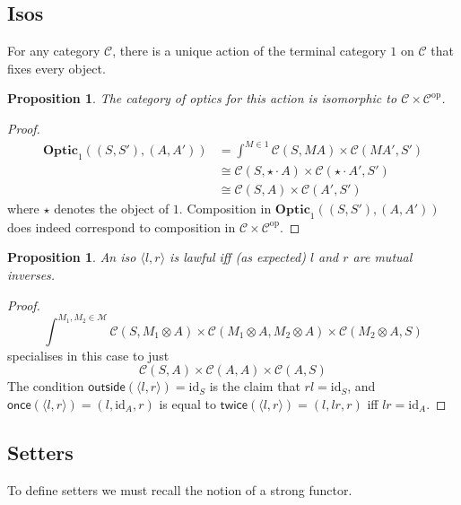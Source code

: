 \documentclass[11pt,a4paper]{article}
\theoremstyle{plain}
\newtheorem{proposition}[theorem]{Proposition}
\theoremstyle{definition}
\newcommand{\C}{\mathscr{C}}
\newcommand{\M}{\mathscr{M}}
\newcommand{\Optic}{\mathbf{Optic}}
\newcommand{\id}{\mathrm{id}}
\newcommand{\op}{\mathrm{op}}
\newcommand{\outside}{\mathsf{outside}}
\newcommand{\once}{\mathsf{once}}
\newcommand{\twice}{\mathsf{twice}}
\begin{document}
\subsection{Isos}

For any category $\C$, there is a unique action of the terminal category $1$ on $\C$ that fixes every object.

\begin{proposition}
  The category of optics for this action is isomorphic to $\C \times \C^\op$.
\end{proposition}
\begin{proof}
  \begin{align*}
    \Optic_1((S, S'), (A, A')) &= \int^{M \in 1} \C(S, MA) \times \C(MA', S') \\
                               &\cong \C(S, \star \cdot A) \times \C(\star \cdot A', S') \\
                               &\cong \C(S, A) \times \C(A', S')
  \end{align*}
  where $\star$ denotes the object of $1$. Composition in $\Optic_1((S, S'), (A, A'))$ does indeed correspond to composition in $\C \times \C^\op$.
\end{proof}

\begin{proposition}
  An iso $\langle l, r \rangle$ is lawful iff (as expected) $l$ and $r$ are mutual inverses.
\end{proposition}
\begin{proof}
  \[ \int^{M_1, M_2 \in \M} \C(S, M_1 \otimes A) \times \C(M_1 \otimes A, M_2 \otimes A) \times \C(M_2 \otimes A, S) \]
  specialises in this case to just
  \[ \C(S, A) \times \C(A, A) \times \C(A, S) \]
  The condition $\outside(\langle l, r \rangle) = \id_S$ is the claim that $rl = \id_S$, and $\once(\langle l, r \rangle) = (l, \id_A, r)$ is equal to $\twice(\langle l, r \rangle) = (l, lr, r)$ iff $lr = \id_A$.
\end{proof}

\subsection{Setters}

To define setters we must recall the notion of a strong functor.
\end{document}

